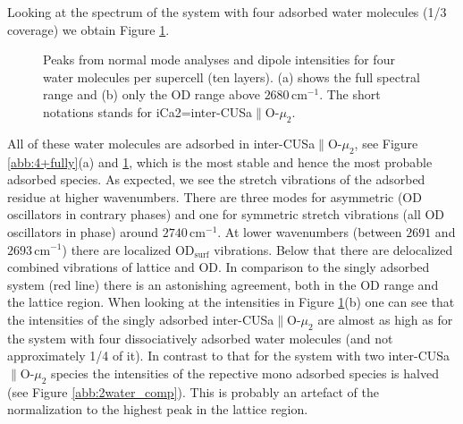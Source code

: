 \documentclass[11pt,DIV=13,BCOR=5mm,a4paper,headinclude]{scrbook}
\begin{document}
Looking at the spectrum of the system with four adsorbed water molecules (1/3 coverage) we obtain Figure \ref{abb:4water}.
\begin{figure}[!h]
    \centering
             \quad
             \quad
             \caption{Peaks from normal mode analyses and dipole intensities for four water molecules per supercell (ten layers).
(a) shows the full spectral range and (b) only the OD range above $2680\,$cm$^{-1}$.
The short notations stands for iCa2=inter-CUSa$\parallel$O-$\mu_2$.}
            \label{abb:4water}
\end{figure}
All of these water molecules are adsorbed in inter-CUSa$\parallel$O-$\mu_2$, see Figure \ref{abb:4+fully}(a) and \ref{abb:4water}, which is the most stable and hence the most probable adsorbed species.
As expected, we see the stretch vibrations of the adsorbed residue at higher wavenumbers.
There are three modes for asymmetric (OD oscillators in contrary phases) and one for symmetric stretch vibrations (all OD oscillators in phase) around $2740\,$cm$^{-1}$.
At lower wavenumbers (between $2691$ and $2693\,$cm$^{-1}$) there are localized OD$_\textrm{surf}$ vibrations.
Below that there are delocalized combined vibrations of lattice and OD.
In comparison to the singly adsorbed system (red line) there is an astonishing agreement, both in the OD range and the lattice region.
When looking at the intensities in Figure \ref{abb:4water}(b) one can see that the intensities of the singly adsorbed inter-CUSa$\parallel$O-$\mu_2$ are almost as high as for the system with four dissociatively adsorbed water molecules (and not approximately 1/4 of it).
In contrast to that for the system with two inter-CUSa$\parallel$O-$\mu_2$ species the intensities of the repective mono adsorbed species is halved (see Figure \ref{abb:2water_comp}).
This is probably an artefact of the normalization to the highest peak in the lattice region.
\end{document}
